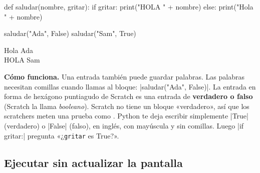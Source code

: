 \begin{tcbraster}[raster columns=2, raster equal height=rows, raster column skip=12pt, raster valign=center, raster force size=false, raster column 1/.style={add to width=-2cm}, raster column 2/.style={add to width=2cm}]
\begin{tcolorbox}[colback=white, colframe=white, boxrule=0pt, valign=center]
\begin{scratch}[scale=0.77]
\end{scratch}
\par\medskip
\begin{scratch}
\end{scratch}
\end{tcolorbox}
\begin{code}
def saludar(nombre, gritar):
    if gritar:
        print("HOLA " + nombre)
    else:
        print("Hola " + nombre)

saludar("Ada", False)
saludar("Sam", True)
\end{code}
\end{tcbraster}

\begin{outputbox}
Hola Ada\\
HOLA Sam
\end{outputbox}

\textbf{Cómo funciona.} Una entrada también puede guardar palabras. Las palabras necesitan comillas cuando llamas al bloque: \py|saludar("Ada", False)|. La entrada en forma de hexágono puntiagudo de Scratch es una entrada de \textbf{verdadero o falso} (Scratch la llama \textit{booleano}). Scratch no tiene un bloque «verdadero», así que los scratchers meten una prueba como . Python te deja escribir simplemente \py|True| (verdadero) o \py|False| (falso), en inglés, con mayúscula y sin comillas. Luego \py|if gritar:| pregunta «¿\texttt{gritar} es True?».

\subsection*{Ejecutar sin actualizar la pantalla}

